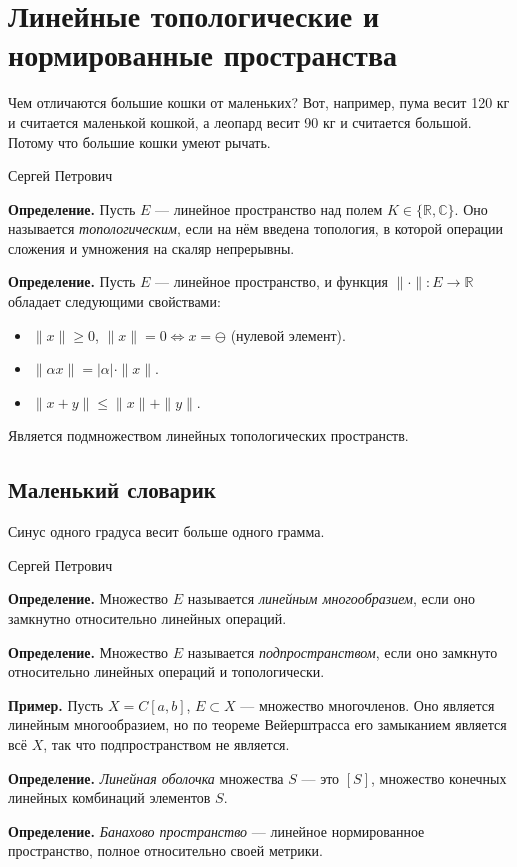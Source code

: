 \section{Линейные топологические и нормированные пространства}
\epigraph{
Чем отличаются большие кошки от маленьких? Вот, например, пума весит 120 кг и считается маленькой кошкой, а леопард весит 90 кг и считается большой.
Потому что большие кошки умеют рычать.
}{Сергей Петрович}

\textbf{Определение.} Пусть $E$ --- линейное пространство над полем $K \in \{\mathbb R, \mathbb C\}$.
Оно называется \textit{топологическим}, если на нём введена топология, в которой операции сложения и умножения на скаляр непрерывны.

\textbf{Определение.} Пусть $E$ --- линейное пространство, и функция $\|\cdot\|: E \to \mathbb R$ обладает следующими свойствами:
\begin{itemize}
    \item $\|x\| \ge 0$, $\|x\| = 0 \iff x = \ominus$ (нулевой элемент).
    \item $\|\alpha x \| = |\alpha| \cdot \|x\|$.
    \item $\|x + y\| \le \|x\| + \|y\|$.
\end{itemize}
Является подмножеством линейных топологических пространств.

\subsection{Маленький словарик}
\epigraph{Синус одного градуса весит больше одного грамма.}{Сергей Петрович}
\textbf{Определение.} Множество $E$ называется \textit{линейным многообразием}, если оно замкнутно относительно линейных операций.

\textbf{Определение.} Множество $E$ называется \textit{подпространством}, если оно замкнуто относительно линейных операций и топологически.

\textbf{Пример.} Пусть $X = C[a, b]$, $E \subset X$ --- множество многочленов.
Оно является линейным многообразием, но по теореме Вейерштрасса его замыканием является всё $X$, так что подпространством не является.

\textbf{Определение.} \textit{Линейная оболочка} множества $S$ --- это $[S]$, множество конечных линейных комбинаций элементов $S$.

\textbf{Определение.} \textit{Банахово пространство} --- линейное нормированное пространство, полное относительно своей метрики.

